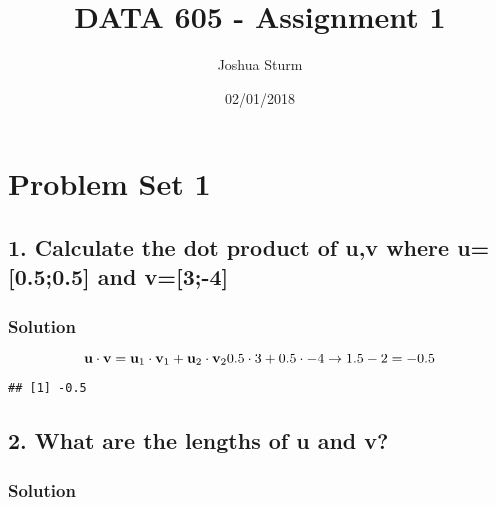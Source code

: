 \documentclass[]{article}
\title{DATA 605 - Assignment 1}
\author{Joshua Sturm}
\date{02/01/2018}
\newenvironment{Shaded}{\begin{snugshade}}{\end{snugshade}}
\newcommand{\KeywordTok}[1]{\textcolor[rgb]{0.13,0.29,0.53}{\textbf{#1}}}
\newcommand{\DecValTok}[1]{\textcolor[rgb]{0.00,0.00,0.81}{#1}}
\newcommand{\FloatTok}[1]{\textcolor[rgb]{0.00,0.00,0.81}{#1}}
\newcommand{\StringTok}[1]{\textcolor[rgb]{0.31,0.60,0.02}{#1}}
\newcommand{\CommentTok}[1]{\textcolor[rgb]{0.56,0.35,0.01}{\textit{#1}}}
\newcommand{\OperatorTok}[1]{\textcolor[rgb]{0.81,0.36,0.00}{\textbf{#1}}}
\newcommand{\NormalTok}[1]{#1}
\begin{document}
\maketitle

\section{Problem Set 1}\label{problem-set-1}

\subsection{1. Calculate the dot product of u,v where u={[}0.5;0.5{]}
and
v={[}3;-4{]}}\label{calculate-the-dot-product-of-uv-where-u0.50.5-and-v3-4}

\subsubsection{Solution}\label{solution}

\[ \textbf{u} \cdot \textbf{v} = \textbf{u}_1\cdot \textbf{v}_1 + \textbf{u}_2\cdot \textbf{v}_2 \\
0.5\cdot 3 + 0.5\cdot -4 \to 1.5 - 2 = -0.5\]

\begin{Shaded}
\end{Shaded}

\begin{verbatim}
## [1] -0.5
\end{verbatim}

\subsection{2. What are the lengths of u and
v?}\label{what-are-the-lengths-of-u-and-v}

\subsubsection{Solution}\label{solution-1}
\end{document}
